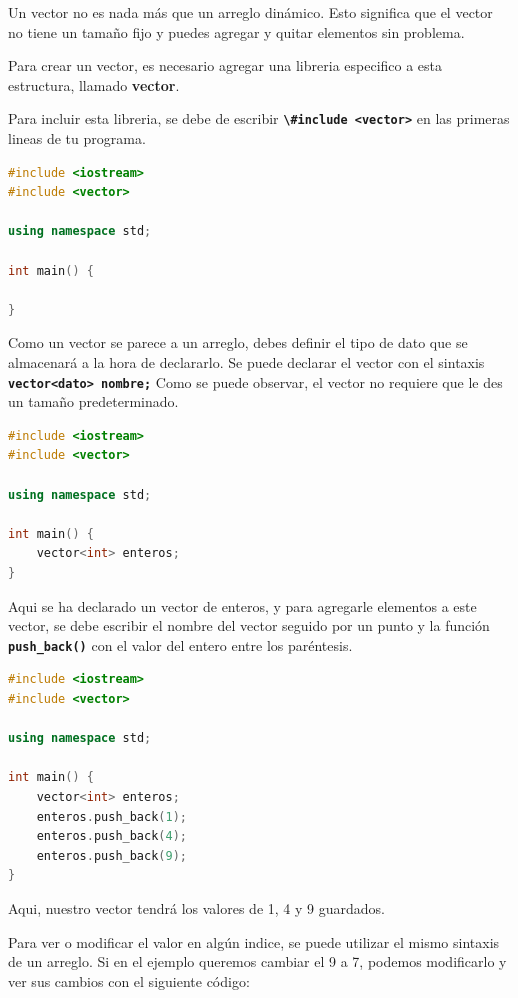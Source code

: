 \documentclass{article}
\begin{document}
Un vector no es nada más que un arreglo dinámico. Esto significa que el vector no tiene un tamaño fijo y puedes agregar y quitar elementos sin problema.

Para crear un vector, es necesario agregar una libreria especifico a esta estructura, llamado \textbf{vector}.

Para incluir esta libreria, se debe de escribir \textbf{\lstinline{\#include <vector>}} en las primeras lineas de tu programa.

\begin{lstlisting}[language=C++, caption=Vectores]
#include <iostream>
#include <vector>

using namespace std;

int main() {

}
\end{lstlisting}

Como un vector se parece a un arreglo, debes definir el tipo de dato que se almacenará a la hora de declararlo. Se puede declarar el vector con el sintaxis \textbf{\lstinline{vector<dato> nombre;}} Como se puede observar, el vector no requiere que le des un tamaño predeterminado.

\begin{lstlisting}[language=C++, caption=Vectores]
#include <iostream>
#include <vector>

using namespace std;

int main() {
    vector<int> enteros;
}
\end{lstlisting}

Aqui se ha declarado un vector de enteros, y para agregarle elementos a este vector, se debe escribir el nombre del vector seguido por un punto y la función \textbf{\lstinline{push_back()}} con el valor del entero entre los paréntesis.

\begin{lstlisting}[language=C++, caption=Agregando valores]
#include <iostream>
#include <vector>

using namespace std;

int main() {
    vector<int> enteros;
    enteros.push_back(1);
    enteros.push_back(4);
    enteros.push_back(9);
}
\end{lstlisting}

Aqui, nuestro vector tendrá los valores de 1, 4 y 9 guardados.

Para ver o modificar el valor en algún indice, se puede utilizar el mismo sintaxis de un arreglo. Si en el ejemplo queremos cambiar el 9 a 7, podemos modificarlo y ver sus cambios con el siguiente código:
\end{document}
